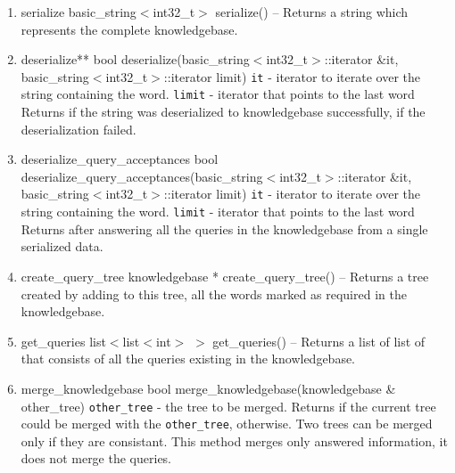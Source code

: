 \begin{enumerate}
\begin{detail}
\end{detail}
\item \begin{detail}
{serialize}
{basic\_string$<$int32\_t$>$ serialize()}
{--}
{Returns a string which represents the complete knowledgebase.} 
\end{detail}
\item \begin{detail}
{deserialize**}
{bool deserialize(basic\_string$<$int32\_t$>$::iterator \&it, \\ basic\_string$<$int32\_t$>$::iterator limit)}
{\texttt{it} - iterator to iterate over the string containing the word.
 \texttt{limit} - iterator that points to the last word }
{Returns \true if the string was deserialized to knowledgebase successfully, \false if the deserialization failed.} 
\end{detail}
\item \begin{detail}
{deserialize\_query\_acceptances}
{bool deserialize\_query\_acceptances(basic\_string$<$int32\_t$>$::iterator \&it,\\ basic\_string$<$int32\_t$>$::iterator limit)}
{\texttt{it} - iterator to iterate over the string containing the word.
 \texttt{limit} - iterator that points to the last word }
{Returns \true after answering all the queries in the knowledgebase from a single serialized data. } 
\end{detail}
\item \begin{detail}
{create\_query\_tree}
{knowledgebase * create\_query\_tree()}
{--}
{Returns a tree created by adding to this tree, all the words marked as required in the knowledgebase.} 
\end{detail}
\item \begin{detail}
{get\_queries}
{list$<$list$<$int$>$ $>$ get\_queries()}
{--}
{Returns a list of list of \integer that consists of all the queries existing in the knowledgebase.} 
\end{detail}
\item \begin{detail}
{merge\_knowledgebase}
{bool merge\_knowledgebase(knowledgebase \& other\_tree)}
{\texttt{other\_tree} - the tree to be merged.}
{Returns \true if the current tree could be merged with the \texttt{other\_tree}, \false otherwise. Two trees can be merged only if they are consistant. This method merges only answered information, it does not merge the queries. } 

\end{detail}
\end{enumerate}
